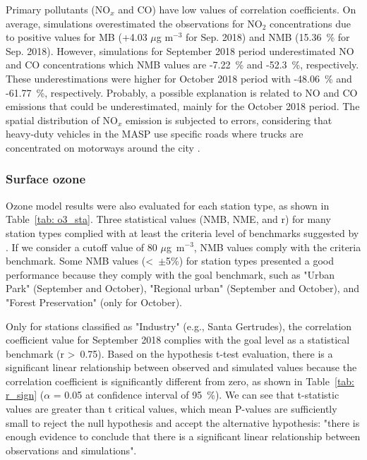   Primary pollutants (NO$_x$ and CO) have low values of correlation coefficients.
  On average, simulations overestimated the observations for NO$_2$ concentrations due to positive values for MB (+4.03 $\mu$g m$^{-3}$ for Sep. 2018) and NMB (15.36~\% for Sep. 2018).
  However, simulations for September 2018 period underestimated NO and CO concentrations which NMB values are -7.22~\% and -52.3~\%, respectively.
  These underestimations were higher for October 2018 period with -48.06~\% and -61.77~\%, respectively.
  Probably, a possible explanation is related to NO and CO emissions that could be underestimated, mainly for the October 2018 period.
  The spatial distribution of NO$_x$ emission is subjected to errors, considering that heavy-duty vehicles in the MASP use specific roads where trucks are concentrated on motorways around the city \citep{Ibarra2020}.
  
  
  
   \subsubsection{Surface ozone}
  Ozone model results were also evaluated for each station type, as shown in Table~\ref{tab: o3_sta}. 
  Three statistical values (NMB, NME, and r) for many station types complied with at least the criteria level of benchmarks suggested by \citet{Emery2017}.
  If we consider a cutoff value of 80 $\mu$g~m$^{-3}$, NMB values comply with the criteria benchmark. 
  Some NMB values (<~$\pm$5\%) for station types presented a good performance because they comply with the goal benchmark, such as "Urban Park" (September and October), "Regional urban" (September and October), and "Forest Preservation" (only for October).

  Only for stations classified as "Industry" (e.g., Santa Gertrudes), the correlation coefficient value for September 2018 complies with the goal level as a statistical benchmark (r >~0.75).
  Based on the hypothesis t-test evaluation, there is a significant linear relationship between observed and simulated values because the correlation coefficient is significantly different from zero, as shown in Table~\ref{tab: r_sign} ($\alpha$ = 0.05 at confidence interval of 95~\%).
  We can see that t-statistic values are greater than t critical values, which mean P-values are sufficiently small to reject the null hypothesis and accept the alternative hypothesis: "there is enough evidence to conclude that there is a significant linear relationship between observations and simulations".
  
  
  
